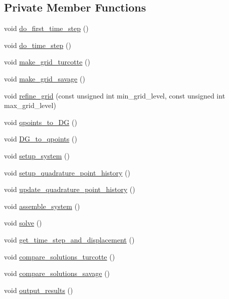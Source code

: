 \subsection*{Private Member Functions}
\begin{DoxyCompactItemize}
\item 
void \hyperlink{classvsf_1_1ApShear_a49ba2c773ca4f6a1946dee0d08e76901}{do\-\_\-first\-\_\-time\-\_\-step} ()
\item 
void \hyperlink{classvsf_1_1ApShear_a230bde382d9f71b56181ae943634611e}{do\-\_\-time\-\_\-step} ()
\item 
void \hyperlink{classvsf_1_1ApShear_ab12b87e8d50262d7735c5ba0aab1549f}{make\-\_\-grid\-\_\-turcotte} ()
\item 
void \hyperlink{classvsf_1_1ApShear_a265e55ba004056c96ab59aa633d5510f}{make\-\_\-grid\-\_\-savage} ()
\item 
void \hyperlink{classvsf_1_1ApShear_ae0c1413d01e98526e4a61a7324bf2ae0}{refine\-\_\-grid} (const unsigned int min\-\_\-grid\-\_\-level, const unsigned int max\-\_\-grid\-\_\-level)
\item 
void \hyperlink{classvsf_1_1ApShear_ad0d3a17afc6092f53560a50fd21c82f3}{qpoints\-\_\-to\-\_\-\-D\-G} ()
\item 
void \hyperlink{classvsf_1_1ApShear_accf1d57fc6f81758bf06a93ef70f74c4}{D\-G\-\_\-to\-\_\-qpoints} ()
\item 
void \hyperlink{classvsf_1_1ApShear_aa64a11292b5664242bb982a1a400fae0}{setup\-\_\-system} ()
\item 
void \hyperlink{classvsf_1_1ApShear_a7e74ebe08f8b6586a71c606a64ab4db4}{setup\-\_\-quadrature\-\_\-point\-\_\-history} ()
\item 
void \hyperlink{classvsf_1_1ApShear_a6b2acd54f930d5deac94064923e1aa7b}{update\-\_\-quadrature\-\_\-point\-\_\-history} ()
\item 
void \hyperlink{classvsf_1_1ApShear_a53c9284a86fc90a817ddad24eaf18569}{assemble\-\_\-system} ()
\item 
void \hyperlink{classvsf_1_1ApShear_a7e90fa26f6c78252f8e4592d5fc7adcf}{solve} ()
\item 
void \hyperlink{classvsf_1_1ApShear_a2441c4bb1e59eb8d8fa5f37d7e66da26}{get\-\_\-time\-\_\-step\-\_\-and\-\_\-displacement} ()
\item 
void \hyperlink{classvsf_1_1ApShear_aa7a681d59cd2147f021245e7cccc0d32}{compare\-\_\-solutions\-\_\-turcotte} ()
\item 
void \hyperlink{classvsf_1_1ApShear_a2b1bb3ca132f62ccf3c2ca1e4e81f97c}{compare\-\_\-solutions\-\_\-savage} ()
\item 
void \hyperlink{classvsf_1_1ApShear_af10b1bbda00ef235b3bff742831890bf}{output\-\_\-results} ()
\end{DoxyCompactItemize}
